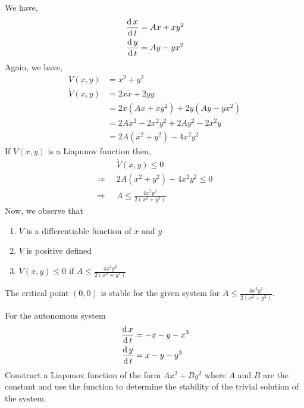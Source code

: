 \documentclass[../main-sheet.tex]{subfiles}
\begin{document}
\begin{soln}
    We have,
    \begin{align*}
        \,\frac{\mathrm{d}\,x}{\mathrm{d}\,t}&=Ax+xy^2\\
        \,\frac{\mathrm{d}\,y}{\mathrm{d}\,t}&=Ay-yx^2
    \end{align*}
    Again, we have,
    \begin{align*}
        V(x,y)&=x^2+y^2\\
        \dot{V}(x,y)&=2x\dot{x}+2y\dot{y}\\
        &=2x(Ax+xy^2)+2y(Ay-yx^2)\\
        &=2Ax^2-2x^2y^2+2Ay^2-2x^2y\\
        &=2A(x^2+y^2)-4x^2y^2
    \end{align*}
    If \(V(x,y)\) is a Liapunov function then,
    \begin{align*}
        &\dot{V}(x,y)\leq 0\\
        \Rightarrow\;\;&2A(x^2+y^2)-4x^2y^2\leq 0\\
        \Rightarrow\;\;&A\leq \frac{4x^2y^2}{2(x^2+y^2)}
    \end{align*}
    Now, we observe that
    \begin{enumerate}[label=(\roman*)]
        \item \(V\) is a differentiable function of \(x\) and \(y\)
        \item \(V\) is positive defined
        \item \(\dot{V}(x,y)\leq 0\) if \(A\leq \frac{4x^2y^2}{2(x^2+y^2)}\)
    \end{enumerate}
    The critical point \((0,0)\) is stable for the given system for \(A\leq \frac{4x^2y^2}{2(x^2+y^2)}\).
\end{soln}
\begin{prob}
    For the autonomous system 
    \begin{align*}
        \,\frac{\mathrm{d}\,x}{\mathrm{d}\,t}&=-x-y-x^3\\
        \,\frac{\mathrm{d}\,y}{\mathrm{d}\,t}&=x-y-y^3
    \end{align*}
    Construct a Liapunov function of the form \(Ax^2+By^2\) where \(A\) and \(B\) are the constant and use the function to determine the stability of the trivial solution of the system.
\end{prob}
\end{document}
